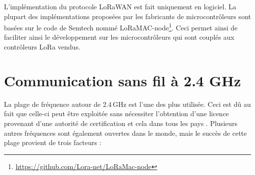L'implémentation du protocole LoRaWAN est fait uniquement en logiciel. La plupart des implémentations proposées par les fabricants de microcontrôleurs sont basées sur le code de Semtech nommé LoRaMAC-node\footnote{\url{https://github.com/Lora-net/LoRaMac-node}}. Ceci permet ainsi de faciliter ainsi le développement sur les microcontrôleurs qui sont couplés aux contrôleurs LoRa vendus.


\section{Communication sans fil à 2.4 GHz}
\label{sec_2_4_GHz}

La plage de fréquence autour de 2.4\,GHz est l'une des plus utilisée. Ceci est dû au fait que celle-ci peut être exploitée sans nécessiter l'obtention d'une licence provenant d'une autorité de certification et cela dans tous les pays \cite{ISMbandW77:online}. Plusieurs autres fréquences sont également ouvertes dans le monde, mais le succès de cette plage provient de trois facteurs : 
